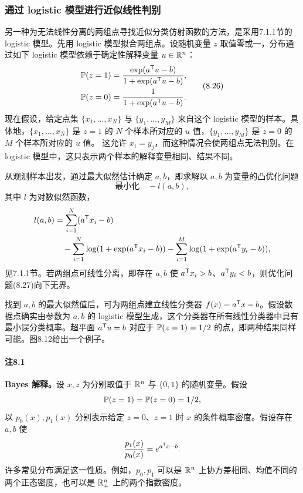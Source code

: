 \subsubsection*{通过 logistic 模型进行近似线性判别}
另一种为无法线性分离的两组点寻找近似分类仿射函数的方法，是采用7.1.1节的 logistic 模型。先用 logistic 模型拟合两组点。设随机变量 $z$ 取值零或一，分布通过如下 logistic 模型依赖于确定性解释变量 $u\in\mathbb R^n$：
\begin{equation}\begin{aligned}
 \mathbb P(z=1)&=\frac{\exp(a^\mathsf T u-b)}{1+\exp(a^\mathsf T u-b)},\\
 \mathbb P(z=0)&=\frac1{1+\exp(a^\mathsf T u-b)}.
\end{aligned}\tag{8.26}\end{equation}
现在假设，给定点集 $\{x_1,\ldots,x_N\}$ 与 $\{y_1,\ldots,y_M\}$ 来自这个 logistic 模型的样本。具体地，$\{x_1,\ldots,x_N\}$ 是 $z=1$ 的 $N$ 个样本所对应的 $u$ 值，$\{y_1,\ldots,y_M\}$ 是 $z=0$ 的 $M$ 个样本所对应的 $u$ 值。
这允许 $x_i=y_j$，而这种情况会使两组点无法判别。在 logistic 模型中，这只表示两个样本的解释变量相同、结果不同。

从观测样本出发，通过最大似然估计确定 $a,b$，即求解以 $a,b$ 为变量的凸优化问题
\begin{equation}\text{最小化}\quad-l(a,b),\tag{8.27}\end{equation}
其中 $l$ 为对数似然函数，
\[\begin{aligned}
 l(a,b)&=\sum_{i=1}^N(a^\mathsf T x_i-b)\\
 &\quad-\sum_{i=1}^N\log(1+\exp(a^\mathsf T x_i-b))
       -\sum_{i=1}^M\log(1+\exp(a^\mathsf T y_i-b)),
\end{aligned}\]
见7.1.1节。若两组点可线性分离，即存在 $a,b$ 使 $a^\mathsf T x_i>b$、$a^\mathsf T y_i<b$，则优化问题(8.27)向下无界。

找到 $a,b$ 的最大似然值后，可为两组点建立线性分类器 $f(x)=a^\mathsf T x-b$。假设数据点确实由参数为 $a,b$ 的 logistic 模型生成，这个分类器在所有线性分类器中具有最小误分类概率。超平面 $a^\mathsf T u=b$ 对应于 $\mathbb P(z=1)=1/2$ 的点，即两种结果同样可能。图8.12给出一个例子。
\paragraph{注8.1}\textbf{Bayes 解释。}设 $x,z$ 为分别取值于 $\mathbb R^n$ 与 $\{0,1\}$ 的随机变量。假设
\[\mathbb P(z=1)=\mathbb P(z=0)=1/2,\]
以 $p_0(x),p_1(x)$ 分别表示给定 $z=0$、$z=1$ 时 $x$ 的条件概率密度。假设存在 $a,b$ 使
\[\frac{p_1(x)}{p_0(x)}=e^{a^\mathsf T x-b}.\]
许多常见分布满足这一性质。例如，$p_0,p_1$ 可以是 $\mathbb R^n$ 上协方差相同、均值不同的两个正态密度，也可以是 $\mathbb R_+^n$ 上的两个指数密度。

